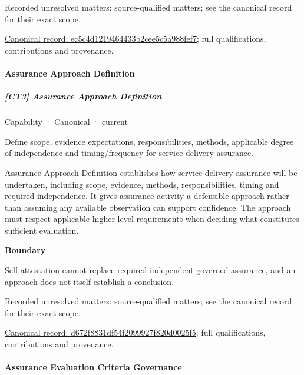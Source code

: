 {\small Recorded unresolved matters: source-qualified matters; see the canonical record for their exact scope.}\par
{\footnotesize \href{../../../../continuum/strategy/capability/ec5c4d1219464433b2cee5c5a988fef7.md}{Canonical record: ec5c4d1219464433b2cee5c5a988fef7}; full qualifications, contributions and provenance.}\par
\paragraph{Assurance Approach Definition}

\subparagraph{[CT3] Assurance Approach Definition}

\label{element:d672f8831df54f2099927f820d0025f5}
{\small Capability · Canonical · current}\par

Define scope, evidence expectations, responsibilities, methods, applicable degree of independence and timing/frequency for service-delivery assurance.



Assurance Approach Definition establishes how service-delivery assurance will be undertaken, including scope, evidence, methods, responsibilities, timing and required independence. It gives assurance activity a defensible approach rather than assuming any available observation can support confidence. The approach must respect applicable higher-level requirements when deciding what constitutes sufficient evaluation.



\textbf{Boundary}



Self-attestation cannot replace required independent governed assurance, and an approach does not itself establish a conclusion.


{\small Recorded unresolved matters: source-qualified matters; see the canonical record for their exact scope.}\par
{\footnotesize \href{../../../../continuum/strategy/capability/d672f8831df54f2099927f820d0025f5.md}{Canonical record: d672f8831df54f2099927f820d0025f5}; full qualifications, contributions and provenance.}\par
\paragraph{Assurance Evaluation Criteria Governance}

